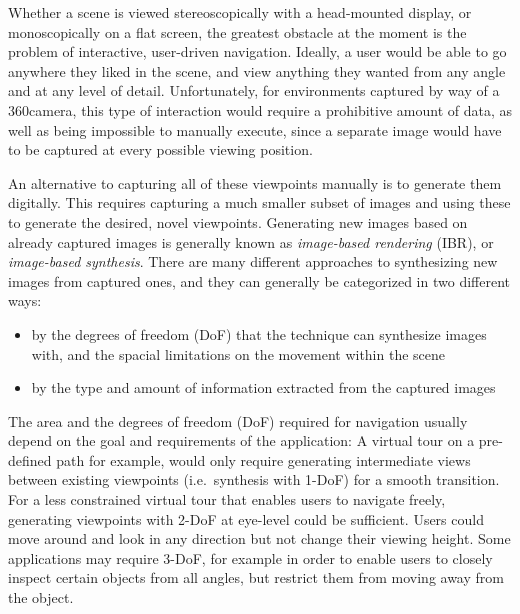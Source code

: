 Whether a scene is viewed stereoscopically with a head-mounted display, or monoscopically on a flat screen, the greatest obstacle at the moment is the problem of interactive, user-driven navigation. Ideally, a user would be able to go anywhere they liked in the scene, and view anything they wanted from any angle and at any level of detail. Unfortunately, for environments captured by way of a 360\degree camera, this type of interaction would require a prohibitive amount of data, as well as being impossible to manually execute, since a separate image would have to be captured at every possible viewing position.
\newpage

An alternative to capturing all of these viewpoints manually is to generate them digitally. This requires capturing a much smaller subset of images and using these to generate the desired, novel viewpoints. Generating new images based on already captured images is generally known as \emph{image-based rendering} (IBR), or \emph{image-based synthesis}. There are many different approaches to synthesizing new images from captured ones, and they can generally be categorized in two different ways:
\begin{itemize}
  \item by the degrees of freedom (DoF) that the technique can synthesize images with, and the spacial limitations on the movement within the scene
  \item by the type and amount of information extracted from the captured images
\end{itemize}

The area and the degrees of freedom (DoF) required for navigation usually depend on the goal and requirements of the application: A virtual tour on a pre-defined path for example, would only require generating intermediate views between existing viewpoints (i.e.\ synthesis with 1-DoF) for a smooth transition. For a less constrained virtual tour that enables users to navigate freely, generating viewpoints with 2-DoF at eye-level could be sufficient. Users could move around and look in any direction but not change their viewing height. Some applications may require 3-DoF, for example in order to enable users to closely inspect certain objects from all angles, but restrict them from moving away from the object.

